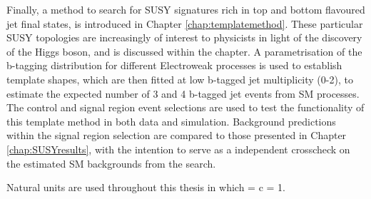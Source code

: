 Finally, a method to search for \ac{SUSY} signatures rich in top and bottom flavoured jet final states, is introduced in Chapter \ref{chap:templatemethod}. These particular \ac{SUSY} topologies are increasingly of interest to physicists in light of the discovery of the Higgs boson, and is discussed within the chapter. A parametrisation of the b-tagging distribution for different Electroweak processes is used to establish template shapes, which are then fitted at low b-tagged jet multiplicity (0-2),  to estimate the expected number of 3 and 4 b-tagged jet events from \ac{SM} processes. The \alphat control and signal region event selections are used to test the functionality of this template method in both data and simulation. Background predictions within the signal region selection are compared to those presented in Chapter \ref{chap:SUSYresults}, with the intention to serve as a independent crosscheck on the estimated \ac{SM} backgrounds from the \alphat search. 

Natural units are used throughout this thesis in which \hbarred = c = 1.
